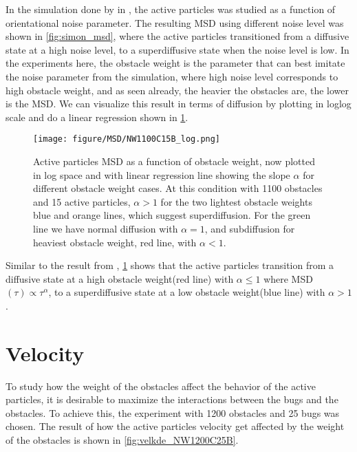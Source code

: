 In the simulation done by \citeauthor{nilsson2017metastable} in , 
the active particles was studied as a function of orientational noise parameter. The resulting 
MSD using different noise level was shown in \cref{fig:simon_msd}, where the active particles 
transitioned from a diffusive state at a high noise level, to a superdiffusive state when the 
noise level is low. In the experiments here, the obstacle weight is the parameter that 
can best imitate the noise parameter from the simulation, where high noise level corresponds 
to high obstacle weight, and as seen already, the heavier 
the obstacles are, the lower is the MSD. We can visualize this result in terms of diffusion 
by plotting in loglog scale and do a linear regression shown in \cref{fig:msd_NW1100C15B_log}.


\begin{figure}[htpb]
    \centering
    \captionsetup{justification=centering,margin=2cm}
    \texttt{[image: figure/MSD/NW1100C15B\_log.png]}
    \caption{Active particles MSD as a function of obstacle weight, now plotted in log space 
	    and with linear regression line showing the slope $\alpha$ for different obstacle 
	    weight cases. At this condition with 1100 obstacles and 15 active particles, 
	    $\alpha>1$ for the two lightest obstacle weights blue and orange lines, which 
	    suggest superdiffusion. For the green line we have normal diffusion with $\alpha=1$, 
	    and subdiffusion for heaviest obstacle weight, red line, with $\alpha<1$.
    }
    \label{fig:msd_NW1100C15B_log}
\end{figure}

Similar to the result from \citeauthor{nilsson2017metastable}, \cref{fig:msd_NW1100C15B_log} shows that 
the active particles transition from a diffusive state at a high obstacle weight(red line) with $\alpha\leq1$ where 
MSD$(\tau)\propto\tau^{\alpha}$, to a superdiffusive state at a low obstacle weight(blue line) with $\alpha>1$. 


\section{Velocity}
To study how the weight of the obstacles affect the behavior of the active particles, 
it is desirable to maximize the interactions between the bugs and the obstacles. 
To achieve this, the experiment with 1200 obstacles and 25 bugs was chosen. The result 
of how the active particles velocity get affected by the weight of the obstacles is shown in 
\cref{fig:velkde_NW1200C25B}.

